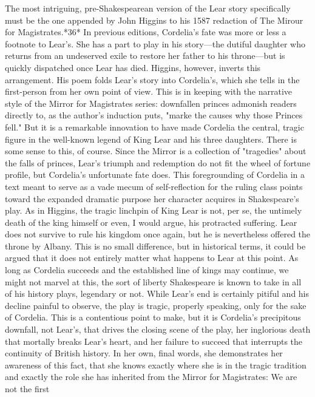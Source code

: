 	The most intriguing, pre-Shakespearean version of the Lear story specifically must be the one appended by John Higgins to his 1587 redaction of The Mirour for Magistrates.*36* In previous editions, Cordelia's fate was more or less a footnote to Lear's. She has a part to play in his story—the dutiful daughter who returns from an undeserved exile to restore her father to his throne—but is quickly dispatched once Lear has died. Higgins, however, inverts this arrangement. His poem folds Lear's story into Cordelia's, which she tells in the first-person from her own point of view. This is in keeping with the narrative style of the Mirror for Magistrates series: downfallen princes admonish readers directly to, as the author's induction puts, "marke the causes why those Princes fell." But it is a remarkable innovation to have made Cordelia the central, tragic figure in the well-known legend of King Lear and his three daughters. There is some sense to this, of course. Since the Mirror is a collection of "tragedies" about the falls of princes, Lear's triumph and redemption do not fit the wheel of fortune profile, but Cordelia's unfortunate fate does. This foregrounding of Cordelia in a text meant to serve as a vade mecum of self-reflection for the ruling class points toward the expanded dramatic purpose her character acquires in Shakespeare's play.
	As in Higgins, the tragic linchpin of King Lear is not, per se, the untimely death of the king himself or even, I would argue, his protracted suffering. Lear does not survive to rule his kingdom once again, but he is nevertheless offered the throne by Albany. This is no small difference, but in historical terms, it could be argued that it does not entirely matter what happens to Lear at this point. As long as Cordelia succeeds and the established line of kings may continue, we might not marvel at this, the sort of liberty Shakespeare is known to take in all of his history plays, legendary or not. While Lear's end is certainly pitiful and his decline painful to observe, the play is tragic, properly speaking, only for the sake of Cordelia. This is a contentious point to make, but it is Cordelia's precipitous downfall, not Lear's, that drives the closing scene of the play, her inglorious death that mortally breaks Lear's heart, and her failure to succeed that interrupts the continuity of British history. In her own, final words, she demonstrates her awareness of this fact, that she knows exactly where she is in the tragic tradition and exactly the role she has inherited from the Mirror for Magistrates:
We are not the first
